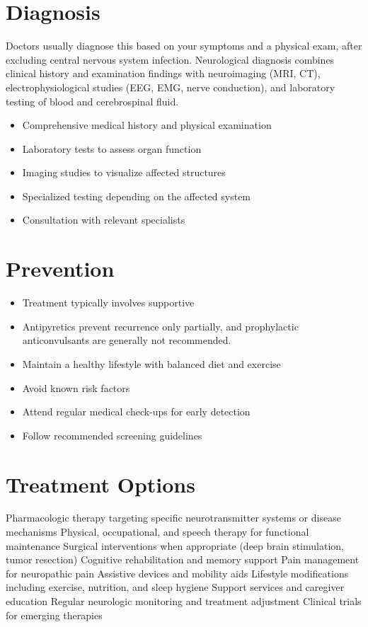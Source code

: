 \section{Diagnosis}
Doctors usually diagnose this based on your symptoms and a physical exam, after excluding central nervous system infection. Neurological diagnosis combines clinical history and examination findings with neuroimaging (MRI, CT), electrophysiological studies (EEG, EMG, nerve conduction), and laboratory testing of blood and cerebrospinal fluid.

\begin{itemize}[noitemsep]
  \item Comprehensive medical history and physical examination
  \item Laboratory tests to assess organ function
  \item Imaging studies to visualize affected structures
  \item Specialized testing depending on the affected system
  \item Consultation with relevant specialists
\end{itemize}
\section{Prevention}
\begin{itemize}[noitemsep]
  \item Treatment typically involves supportive
  \item Antipyretics prevent recurrence only partially, and prophylactic anticonvulsants are generally not recommended.
  \item Maintain a healthy lifestyle with balanced diet and exercise
  \item Avoid known risk factors
  \item Attend regular medical check-ups for early detection
  \item Follow recommended screening guidelines
\end{itemize}
\section{Treatment Options}
Pharmacologic therapy targeting specific neurotransmitter systems or disease mechanisms Physical, occupational, and speech therapy for functional maintenance Surgical interventions when appropriate (deep brain stimulation, tumor resection) Cognitive rehabilitation and memory support Pain management for neuropathic pain Assistive devices and mobility aids Lifestyle modifications including exercise, nutrition, and sleep hygiene Support services and caregiver education Regular neurologic monitoring and treatment adjustment Clinical trials for emerging therapies

